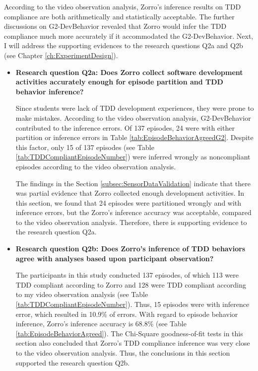 According to the video observation analysis, Zorro's inference results
on TDD compliance are both arithmetically and statistically acceptable. The
further discussions on G2-DevBehavior revealed that Zorro would infer
the TDD compliance much more accurately if it accommodated the
G2-DevBehavior. Next, I will address the supporting evidences to the
research questions Q2a and Q2b (see Chapter
\ref{ch:ExperimentDesign}).

\begin{itemize}
\item{\textbf{Research question Q2a: Does Zorro collect software
development activities accurately enough for episode partition and
TDD behavior inference?}}

Since students were lack of TDD development experiences, they were
prone to make mistakes. According to the video observation analysis,
G2-DevBehavior contributed to the inference errors.  Of 137 episodes,
24 were with either partition or inference errors in Table
\ref{tab:EpisodeBehaviorAgreedG2}.  Despite this factor, only 15 of
137 episodes (see Table \ref{tab:TDDCompliantEpisodeNumber}) were
inferred wrongly as noncompliant episodes according to the video
observation analysis.

The findings in the Section \ref{subsec:SensorDataValidation} indicate
that there was partial evidence that Zorro collected enough
development activities. In this section, we found that 24 episodes
were partitioned wrongly and with inference errors, but the Zorro's
inference accuracy was acceptable, compared to the video observation
analysis. Therefore, there is supporting evidence to the research
question Q2a.

\item{\textbf{Research question Q2b: Does Zorro's inference of TDD
behaviors agree with analyses based upon participant observation?}}

The participants in this study conducted 137 episodes, of which 113
were TDD compliant according to Zorro and 128 were TDD
compliant according to my video observation analysis (see Table
\ref{tab:TDDCompliantEpisodeNumber}). Thus, 15 episodes were with
inference error, which resulted in 10.9\% of errors. With regard
to episode behavior inference, Zorro's inference accuracy is
68.8\% (see Table \ref{tab:EpisodeBehaviorAgreed}). The Chi-Square
goodness-of-fit tests in this section also concluded that Zorro's TDD
compliance inference was very close to the video observation analysis.
Thus, the conclusions in this section supported the research question
Q2b.
\end{itemize}

